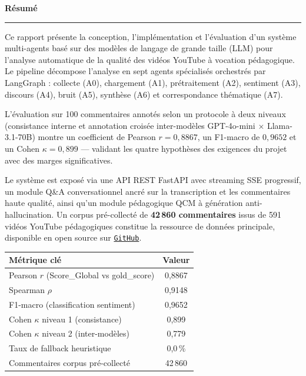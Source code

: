 \documentclass[12pt, a4paper]{article}
\begin{document}
\newpage
\thispagestyle{fancy}
\vspace*{3cm}
\begin{center}
  {\large\bfseries\color{blue!60!black} Résumé}\\[0.5em]
  \rule{0.5\linewidth}{0.6pt}
\end{center}
\vspace{1cm}

\noindent
Ce rapport présente la conception, l'implémentation et l'évaluation d'un système
multi-agents basé sur des modèles de langage de grande taille (LLM) pour l'analyse
automatique de la qualité des vidéos YouTube à vocation pédagogique.
Le pipeline décompose l'analyse en sept agents spécialisés orchestrés par LangGraph :
collecte (A0), chargement (A1), prétraitement (A2), sentiment (A3), discours (A4),
bruit (A5), synthèse (A6) et correspondance thématique (A7).

\vspace{0.8cm}
\noindent
L'évaluation sur 100 commentaires annotés selon un protocole à deux niveaux
(consistance interne et annotation croisée inter-modèles GPT-4o-mini $\times$
Llama-3.1-70B) montre un coefficient de Pearson $r = 0{,}8867$, un F1-macro de
$0{,}9652$ et un Cohen $\kappa = 0{,}899$ — validant les quatre hypothèses des
exigences du projet avec des marges significatives.

\vspace{0.8cm}
\noindent
Le système est exposé via une API REST FastAPI avec streaming SSE progressif,
un module Q\&A conversationnel ancré sur la transcription et les commentaires
haute qualité, ainsi qu'un module pédagogique QCM à génération anti-hallucination.
Un corpus pré-collecté de \textbf{42\,860 commentaires} issus de 591 vidéos
YouTube pédagogiques constitue la ressource de données principale, disponible
en open source sur \href{https://github.com/FerdinandMY/data_collection_youtube}{\texttt{GitHub}}.

\vspace{1cm}
\begin{center}
\begin{tabular}{lc}
\toprule
\textbf{Métrique clé} & \textbf{Valeur} \\
\midrule
Pearson $r$ (Score\_Global vs gold\_score) & 0{,}8867 \\
Spearman $\rho$                            & 0{,}9148 \\
F1-macro (classification sentiment)        & 0{,}9652 \\
Cohen $\kappa$ niveau 1 (consistance)      & 0{,}899  \\
Cohen $\kappa$ niveau 2 (inter-modèles)    & 0{,}779  \\
Taux de fallback heuristique               & 0{,}0\,\% \\
Commentaires corpus pré-collecté           & 42\,860  \\
\bottomrule
\end{tabular}
\end{center}
\end{document}
